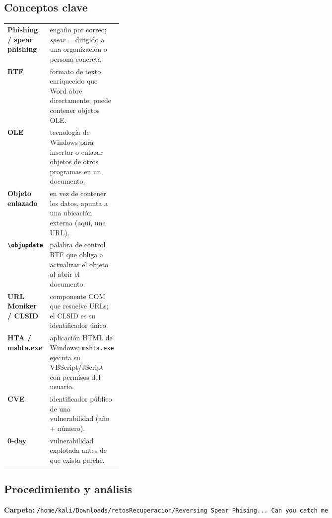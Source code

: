 \documentclass[11pt,a4paper]{article}
\begin{document}
\subsection{Conceptos clave}
\begin{tabularx}{\linewidth}{@{}>{\raggedright\arraybackslash}p{0.27\linewidth}X@{}}
\toprule
\textbf{Phishing / spear phishing} & engaño por correo; \emph{spear} = dirigido a una organización o persona concreta. \\ 
\textbf{RTF} & formato de texto enriquecido que Word abre directamente; puede contener objetos OLE. \\ 
\textbf{OLE} & tecnología de Windows para insertar o enlazar objetos de otros programas en un documento. \\ 
\textbf{Objeto enlazado} & en vez de contener los datos, apunta a una ubicación externa (aquí, una URL). \\ 
\textbf{\texttt{\textbackslash objupdate}} & palabra de control RTF que obliga a actualizar el objeto al abrir el documento. \\ 
\textbf{URL Moniker / CLSID} & componente COM que resuelve URLs; el CLSID es su identificador único. \\ 
\textbf{HTA / mshta.exe} & aplicación HTML de Windows; \texttt{mshta.exe} ejecuta su VBScript/JScript con permisos del usuario. \\ 
\textbf{CVE} & identificador público de una vulnerabilidad (año + número). \\ 
\textbf{0-day} & vulnerabilidad explotada antes de que exista parche. \\ 
\bottomrule
\end{tabularx}

\subsection{Procedimiento y análisis}

\noindent\textbf{Carpeta:} \texttt{/\allowbreak{}home/\allowbreak{}kali/\allowbreak{}Downloads/\allowbreak{}retosRecuperacion/\allowbreak{}Reversing Spear Phising... Can you catch me}
\end{document}
